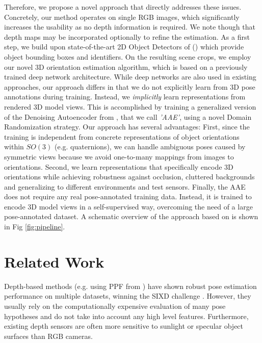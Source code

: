 Therefore, we propose a novel approach that directly
addresses these issues. Concretely, our method operates on single
RGB images, which significantly increases the usability as no depth
information is required. We note though that depth maps may be
incorporated optionally to refine the estimation. As a first
step, we build upon state-of-the-art 2D Object Detectors of (\cite{liu2016ssd,lin2018focal}) which provide object bounding boxes and identifiers. On the resulting scene crops, we
employ our novel 3D orientation estimation algorithm, which is based on a
previously trained deep network architecture. While deep networks are
also used in existing approaches, our approach differs in that we do
not explicitly learn from 3D pose annotations during training. Instead, we
\emph{implicitly} learn representations from rendered 3D model views. This is accomplished by training a generalized version of the Denoising Autoencoder from \cite{vincent2010stacked}, that we call \textit{'\gls{AAE}'}, using a novel Domain Randomization strategy. 
Our approach has several
advantages: First, since the training is independent from concrete representations of object orientations within $SO(3)$ (e.g. 
quaternions), we can handle ambiguous poses caused by symmetric views because we avoid one-to-many mappings from images to orientations. Second, we learn representations that specifically encode 3D orientations while achieving
robustness against occlusion, cluttered backgrounds and generalizing to different environments and test sensors. Finally, the \gls{AAE} does not require any real pose-annotated training data. Instead, it is trained to encode 3D model views in a self-supervised way, overcoming the need of a large pose-annotated dataset. A schematic overview of the approach based on \cite{sundermeyer2018implicit} is shown in Fig \ref{fig:pipeline}.

\section{Related Work\label{sec:relwork}}

Depth-based methods (e.g. using \gls{PPF} from \cite{vidal20186d,hinterstoisser2016going}) have shown robust pose estimation performance on multiple datasets, winning the SIXD challenge \citep{sixd,hodan2018bop}. However, they usually rely on the computationally expensive evaluation of many pose hypotheses and do not take into account any high level features. Furthermore, existing depth sensors are often more sensitive to sunlight or specular object surfaces than RGB cameras.

